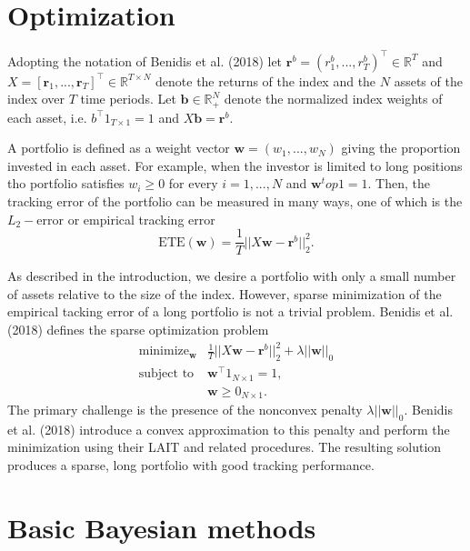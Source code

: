 \documentclass[a4paper, 12pt]{article}
\theoremstyle{plain}
\theoremstyle{definition}
\theoremstyle{remark}
\begin{document}
\section*{Optimization}

Adopting the notation of Benidis et al. (2018) let $\textbf{r}^b = (r_1^b,...,r_T^b)^\top \in \mathbb{R}^T$ and $X = [\textbf{r}_1,...,\textbf{r}_T]^\top \in \mathbb{R}^{T\times N}$ denote the returns of the index and the $N$ assets of the index over $T$ time periods.  Let $\textbf{b}\in\mathbb{R}_+^N$ denote the normalized index weights of each asset, i.e. $b^\top 1_{T\times 1} = 1$ and $X\textbf{b} = \textbf{r}^b$.  

A portfolio is defined as a weight vector $\textbf{w} = (w_1, ..., w_N)$ giving the proportion invested in each asset.  For example, when the investor is limited to long positions tho portfolio satisfies $w_i \geq 0$ for every $i = 1, ..., N$ and $\textbf{w}^top 1 = 1$.  Then, the tracking error of the portfolio can be measured in many ways, one of which is the $L_2-$error or empirical tracking error
\[\text{ETE}(\textbf{w})=\frac{1}{T}||X\textbf{w}-\textbf{r}^b||_2^2.\]

As described in the introduction, we desire a portfolio with only a small number of assets relative to the size of the index.  However, sparse minimization of the empirical tacking error of a long portfolio is not a trivial problem. Benidis et al. (2018) defines the sparse optimization problem
\begin{align}
\text{minimize}_{\textbf{w}}& \frac{1}{T}||X\textbf{w}-\textbf{r}^b||_2^2 + \lambda||\textbf{w}||_0\nonumber\\
\text{subject to}& \textbf{w}^\top 1_{N\times 1}=1, \nonumber \\
 & \textbf{w}\geq 0_{N\times 1}.
\end{align}  
The primary challenge is the presence of the nonconvex penalty $\lambda||\textbf{w}||_0$.  Benidis et al. (2018) introduce a convex approximation to this penalty and perform the minimization using their LAIT and related procedures.  The resulting solution produces a sparse, long portfolio with good tracking performance.

\section{Basic Bayesian methods}
\end{document}

